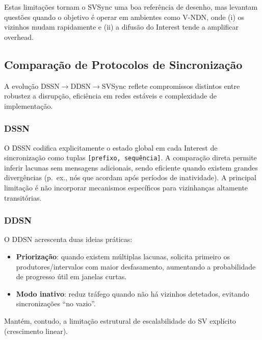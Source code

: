 Estas limitações tornam o \gls{SVSync} uma boa referência de desenho, mas levantam questões quando o objetivo é operar em ambientes como \gls{V-NDN}, onde (i) os vizinhos mudam rapidamente e (ii) a difusão do Interest tende a amplificar overhead.

\vspace{0.15cm}

\subsection{Comparação de Protocolos de Sincronização} 
\label{sub:sync_comparison} 

A evolução \gls{DSSN}$\rightarrow$\gls{DDSN}$\rightarrow$\gls{SVSync} reflete compromissos distintos entre robustez a disrupção, eficiência em redes estáveis e complexidade de implementação.

\subsubsection{DSSN} 
\label{subsub:dssn} 

O \gls{DSSN} \cite{xu_achieving_2018} codifica explicitamente o estado global em cada Interest de sincronização como tuplas \texttt{[prefixo, sequência]}. A comparação direta permite inferir lacunas sem mensagens adicionais, sendo eficiente quando existem grandes divergências (p.\ ex., nós que acordam após períodos de inatividade). A principal limitação é não incorporar mecanismos específicos para vizinhanças altamente transitórias.

\subsubsection{DDSN} 
\label{subsub:ddsn} 

O \gls{DDSN} \cite{li_distributed_2019} acrescenta duas ideias práticas:
\begin{itemize}
    \item \textbf{Priorização}: quando existem múltiplas lacunas, solicita primeiro os produtores/intervalos com maior desfasamento, aumentando a probabilidade de progresso útil em janelas curtas.
    \item \textbf{Modo inativo}: reduz tráfego quando não há vizinhos detetados, evitando sincronizações “no vazio”.
\end{itemize}
Mantém, contudo, a limitação estrutural de escalabilidade do SV explícito (crescimento linear).


